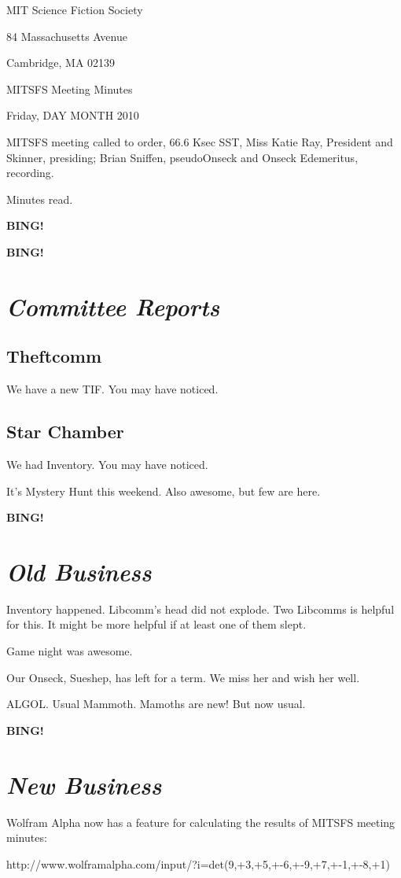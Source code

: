 \documentclass[10pt]{article}
\newcommand{\bing}{{\bf BING!} }
\newcommand{\goto}[1]{\bing \vskip 12pt \section*{{\em{#1}}}}
\newcommand{\skinner}{Miss Katie Ray, President and Skinner}
\newcommand{\onseck}{Brian Sniffen, pseudoOnseck and Onseck Edemeritus}
\newcommand{\meetingdate}{Friday, DAY MONTH 2010}
\begin{document}
\begin{center}

MIT Science Fiction Society

84 Massachusetts Avenue

Cambridge, MA 02139

\vspace{12pt}

MITSFS Meeting Minutes

\meetingdate

\end{center}

\vspace{18pt}

\setlength{\parskip}{6pt}

\noindent
MITSFS meeting called to order, 66.6 Ksec SST,
\skinner, presiding; \onseck, recording.

Minutes read.

\bing

\goto{Committee Reports}

\subsection*{Theftcomm}

We have a new TIF.  You may have noticed.

\subsection*{Star Chamber}

We had Inventory.  You may have noticed.

It's Mystery Hunt this weekend.  Also awesome, but few are here.

\goto{Old Business}

Inventory happened.  Libcomm's head did not explode.  Two Libcomms is
helpful for this.  It might be more helpful if at least one of them slept.

Game night was awesome.

Our Onseck, Sueshep, has left for a term.  We miss her and wish her well.

ALGOL.  Usual Mammoth.  Mamoths are new!  But now usual.

\goto{New Business}

Wolfram Alpha now has a feature for calculating the results of MITSFS meeting
minutes:

http://www.wolframalpha.com/input/?i=det({{9,+3,+5},+{-6,+-9,+7},+{-1,+-8,+1}}) 
\end{document}
